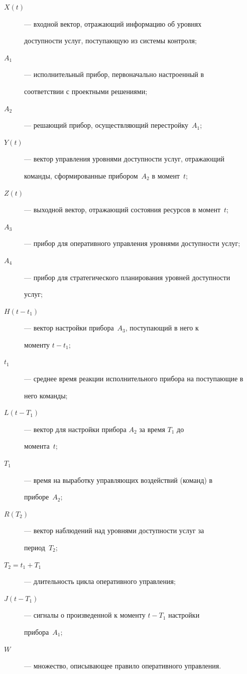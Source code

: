 \begin{description}


\item[$X(t)$] --- входной вектор, отражающий информацию об уровнях 


доступности услуг, поступающую из системы контроля;


\item[$A_1$] --- исполнительный прибор, первоначально настроенный в 


соответствии с проектными решениями;


\item[$A_2$] --- решающий прибор, осуществляющий перестройку~$A_1$;


\item[$Y(t)$] --- вектор управления уровнями доступности услуг, отражающий 


команды, сформированные прибором~$A_2$ в момент~$t$;


\item[$Z(t)$] --- выходной вектор, отражающий состояния ресурсов в момент~$t$;


\item[$A_3$] --- прибор для оперативного управления уровнями доступности услуг;


\item[$A_4$] --- прибор для стратегического планирования уровней доступности 


услуг;


\item[$H(t-t_1)$] --- вектор настройки прибора~$A_3$, поступающий в него к 


моменту $t-t_1$;


\item[$t_1$] --- среднее время реакции исполнительного прибора на поступающие в 


него команды;


\item[$L(t-T_1)$] --- вектор для настройки прибора $A_2$ за время $T_1$ до 


момента~$t$;


\item[$T_1$] --- время на выработку управляющих воздействий (команд) в 


приборе~$A_2$;


\item[$R(T_2)$] --- вектор наблюдений над уровнями доступности услуг за 


период~$T_2$;


\item[$T_2=t_1+T_1$] --- длительность цикла оперативного управления;


\item[$J(t-T_1)$] --- сигналы о произведенной к моменту $t-T_1$ настройки 


прибора~$A_1$;


\item[$W$] --- множество, описывающее правило оперативного управления. 


\end{description}





